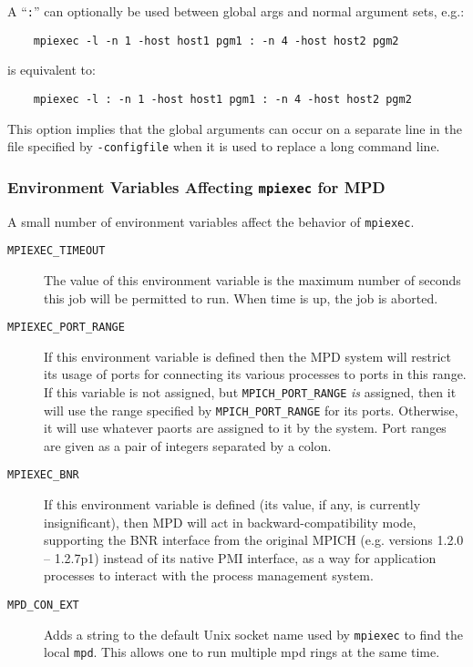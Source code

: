 \documentclass[dvipdfm,11pt]{article}
\begin{document}
A ``\texttt{:}'' can optionally be used between global args
and normal argument sets, e.g.:
\begin{verbatim}
    mpiexec -l -n 1 -host host1 pgm1 : -n 4 -host host2 pgm2
\end{verbatim}
is equivalent to:
\begin{verbatim}
    mpiexec -l : -n 1 -host host1 pgm1 : -n 4 -host host2 pgm2
\end{verbatim}
This option implies that the global arguments can occur on a separate
line in the file specified by \texttt{-configfile} when it is used to 
replace a long command line.

\subsubsection{Environment Variables Affecting \texttt{mpiexec} for MPD}
\label{sec:mpd-mpiexec-env}

A small number of environment variables affect the behavior of
\texttt{mpiexec}. 

\begin{description}
\item[\texttt{MPIEXEC\_TIMEOUT}] The value of this environment variable is the
  maximum number of seconds this job will be permitted to run.  When
  time is up, the job is aborted.
\item[\texttt{MPIEXEC\_PORT\_RANGE}] If this environment variable is
  defined then the MPD system will restrict its usage of ports for
  connecting its various processes to ports in this range.  If this
  variable is not assigned, but \texttt{MPICH\_PORT\_RANGE} \emph{is}
  assigned, then it will use the range specified by
  \texttt{MPICH\_PORT\_RANGE} for its ports.  Otherwise, it will use
  whatever paorts are assigned to it by the system.  Port ranges are
  given as a pair of integers separated by a colon.
\item[\texttt{MPIEXEC\_BNR}] If this environment variable is defined
  (its value, if any, is currently insignificant), then MPD will act in
  backward-compatibility mode, supporting the BNR interface from the
  original MPICH (e.g. versions 1.2.0 -- 1.2.7p1)
  instead of its native PMI interface, as a way for application
  processes to interact with the process management system.
\item[\texttt{MPD\_CON\_EXT}] Adds a string to the default Unix socket
  name used by \texttt{mpiexec} to find the local \texttt{mpd}.  This
  allows one to run multiple mpd rings at the same time.
\end{description}
\end{document}
